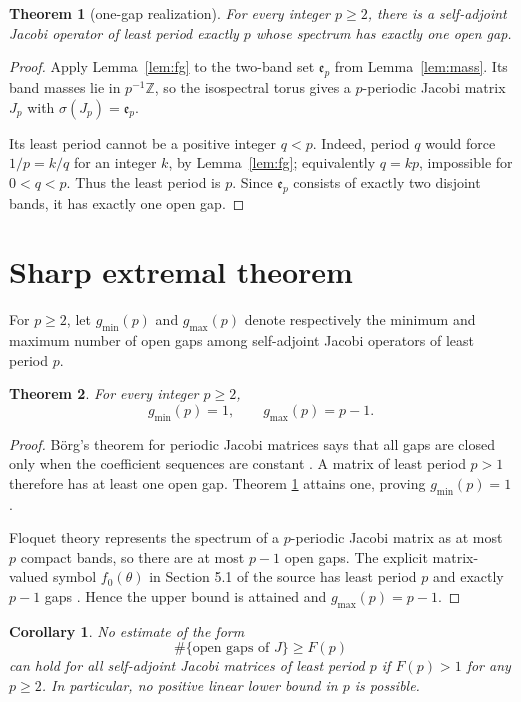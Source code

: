 \documentclass[11pt]{article}
\newtheorem{theorem}{Theorem}
\newtheorem{corollary}{Corollary}
\newcommand{\e}{\mathfrak e}
\begin{document}
\begin{theorem}[one-gap realization]\label{thm:onegap}
For every integer $p\geq2$, there is a self-adjoint Jacobi operator of least
period exactly $p$ whose spectrum has exactly one open gap.
\end{theorem}

\begin{proof}
Apply Lemma~\ref{lem:fg} to the two-band set $\e_p$ from
Lemma~\ref{lem:mass}.  Its band masses lie in $p^{-1}\mathbb Z$, so the
isospectral torus gives a $p$-periodic Jacobi matrix $J_p$ with
$\sigma(J_p)=\e_p$.

Its least period cannot be a positive integer $q<p$.  Indeed, period $q$
would force $1/p=k/q$ for an integer $k$, by Lemma~\ref{lem:fg}; equivalently
$q=kp$, impossible for $0<q<p$.  Thus the least period is $p$.  Since
$\e_p$ consists of exactly two disjoint bands, it has exactly one open gap.
\end{proof}

\section{Sharp extremal theorem}

For $p\geq2$, let $g_{\min}(p)$ and $g_{\max}(p)$ denote respectively the
minimum and maximum number of open gaps among self-adjoint Jacobi operators
of least period $p$.

\begin{theorem}\label{thm:extremal}
For every integer $p\geq2$,
\[
 \boxed{\quad g_{\min}(p)=1,\qquad g_{\max}(p)=p-1.\quad}
\]
\end{theorem}

\begin{proof}
B\"org's theorem for periodic Jacobi matrices says that all gaps are closed
only when the coefficient sequences are constant \cite{KK}.  A matrix of
least period $p>1$ therefore has at least one open gap.  Theorem
\ref{thm:onegap} attains one, proving $g_{\min}(p)=1$.

Floquet theory represents the spectrum of a $p$-periodic Jacobi matrix as at
most $p$ compact bands, so there are at most $p-1$ open gaps.  The explicit
matrix-valued symbol $f_0(\theta)$ in Section 5.1 of the source has least
period $p$ and exactly $p-1$ gaps \cite[p.~21]{KK}.  Hence the upper bound is
attained and $g_{\max}(p)=p-1$.
\end{proof}

\begin{corollary}
No estimate of the form
\[
 \#\{\text{open gaps of }J\}\geq F(p)
\]
can hold for all self-adjoint Jacobi matrices of least period $p$ if
$F(p)>1$ for any $p\geq2$.  In particular, no positive linear lower bound in
$p$ is possible.
\end{corollary}
\end{document}
